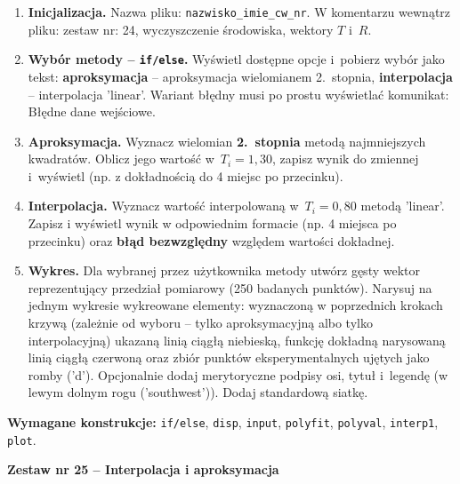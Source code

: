 \documentclass[a4paper,11pt]{article}
\begin{document}
\begin{enumerate}[leftmargin=*, label=\textbf{\arabic*.}, itemsep=2pt]

  \item \textbf{Inicjalizacja.}
    Nazwa pliku: \texttt{nazwisko\_imie\_cw\_nr}. W komentarzu wewnątrz pliku: zestaw nr: 24, wyczyszczenie środowiska, wektory $T$ i~$R$.

  \item \textbf{Wybór metody -- \texttt{if/else}.}
    Wyświetl dostępne opcje i~pobierz wybór jako tekst: \textbf{aproksymacja} -- aproksymacja wielomianem 2.~stopnia, \textbf{interpolacja} -- interpolacja 'linear'. Wariant błędny musi po prostu wyświetlać komunikat: Błędne dane wejściowe.

  \item \textbf{Aproksymacja.}
    Wyznacz wielomian \textbf{2.~stopnia} metodą najmniejszych kwadratów. Oblicz jego wartość w~$T_i = 1{,}30$, zapisz wynik do zmiennej i~wyświetl (np. z dokładnością do 4 miejsc po przecinku).

  \item \textbf{Interpolacja.}
    Wyznacz wartość interpolowaną w~$T_i = 0{,}80$ metodą 'linear'. Zapisz i wyświetl wynik w odpowiednim formacie (np. 4 miejsca po przecinku) oraz \textbf{błąd bezwzględny} względem wartości dokładnej.

  \item \textbf{Wykres.}
    Dla wybranej przez użytkownika metody utwórz gęsty wektor reprezentujący przedział pomiarowy (250 badanych punktów). Narysuj na jednym wykresie wykreowane elementy: wyznaczoną w poprzednich krokach krzywą (zależnie od wyboru -- tylko aproksymacyjną albo tylko interpolacyjną) ukazaną linią ciągłą niebieską, funkcję dokładną narysowaną linią ciągłą czerwoną oraz zbiór punktów eksperymentalnych ujętych jako romby ('d'). Opcjonalnie dodaj merytoryczne podpisy osi, tytuł i~legendę (w lewym dolnym rogu ('southwest')). Dodaj standardową siatkę.

\end{enumerate}

\vspace{0.3cm}
\begin{ramka}
\textbf{Wymagane konstrukcje:}
\texttt{if/else}, \texttt{disp}, \texttt{input}, \texttt{polyfit}, \texttt{polyval}, \texttt{interp1}, \texttt{plot}.
\end{ramka}

\clearpage
\begin{center}
  {\large\bfseries Zestaw nr 25 \quad -- \quad Interpolacja i aproksymacja}
\end{center}
\hrulefill
\vspace{0.4cm}
\end{document}
